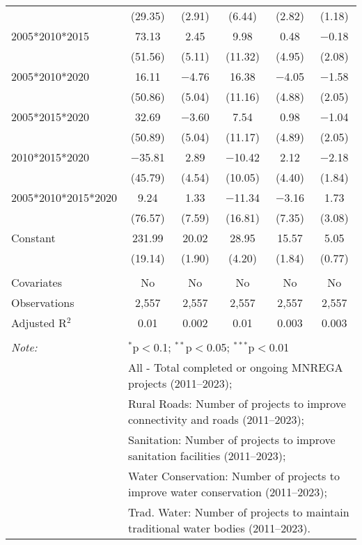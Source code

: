 \begin{table}[!htbp]
\begin{tabular}{@{\extracolsep{0pt}}lccccc}
  & (29.35) & (2.91) & (6.44) & (2.82) & (1.18) \\ 
  2005*2010*2015 & 73.13 & 2.45 & 9.98 & 0.48 & $-$0.18 \\ 
  & (51.56) & (5.11) & (11.32) & (4.95) & (2.08) \\ 
  2005*2010*2020 & 16.11 & $-$4.76 & 16.38 & $-$4.05 & $-$1.58 \\ 
  & (50.86) & (5.04) & (11.16) & (4.88) & (2.05) \\ 
  2005*2015*2020 & 32.69 & $-$3.60 & 7.54 & 0.98 & $-$1.04 \\ 
  & (50.89) & (5.04) & (11.17) & (4.89) & (2.05) \\ 
  2010*2015*2020 & $-$35.81 & 2.89 & $-$10.42 & 2.12 & $-$2.18 \\ 
  & (45.79) & (4.54) & (10.05) & (4.40) & (1.84) \\ 
  2005*2010*2015*2020 & 9.24 & 1.33 & $-$11.34 & $-$3.16 & 1.73 \\ 
  & (76.57) & (7.59) & (16.81) & (7.35) & (3.08) \\ 
  Constant & 231.99 & 20.02 & 28.95 & 15.57 & 5.05 \\ 
  & (19.14) & (1.90) & (4.20) & (1.84) & (0.77) \\ 
 \hline \\[-1.8ex] 
Covariates & No & No & No & No & No \\ 
Observations & 2,557 & 2,557 & 2,557 & 2,557 & 2,557 \\ 
Adjusted R$^{2}$ & 0.01 & 0.002 & 0.01 & 0.003 & 0.003 \\ 
\hline 
\hline \\[-1.8ex] 
\textit{Note:}  & \multicolumn{5}{l}{$^{*}$p$<$0.1; $^{**}$p$<$0.05; $^{***}$p$<$0.01} \\ 
 & \multicolumn{5}{l}{All - Total completed or ongoing MNREGA projects (2011--2023);} \\ 
 & \multicolumn{5}{l}{Rural Roads: Number of projects to improve connectivity and roads (2011--2023);} \\ 
 & \multicolumn{5}{l}{Sanitation:  Number of projects to improve sanitation facilities  (2011--2023);} \\ 
 & \multicolumn{5}{l}{Water Conservation: Number of projects to improve water conservation (2011--2023);} \\ 
 & \multicolumn{5}{l}{Trad. Water: Number of projects to maintain traditional water bodies (2011--2023).} \\ 
\end{tabular} 
\end{table} 
